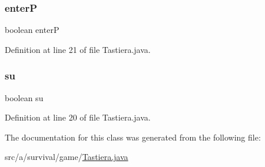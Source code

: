 \subsubsection{\texorpdfstring{enterP}{enterP}}
{\footnotesize\ttfamily boolean enterP}



Definition at line 21 of file Tastiera.\+java.

\mbox{\label{classa_1_1survival_1_1game_1_1_tastiera_aff855f281d61fe7d477455d95672ad77}} 
\subsubsection{\texorpdfstring{su}{su}}
{\footnotesize\ttfamily boolean su}



Definition at line 20 of file Tastiera.\+java.



The documentation for this class was generated from the following file\+:\begin{DoxyCompactItemize}
\item 
src/a/survival/game/\hyperlink{_tastiera_8java}{Tastiera.\+java}\end{DoxyCompactItemize}

